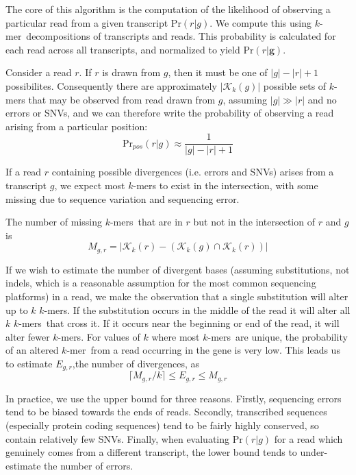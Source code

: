 \documentclass{bioinfo}
\newcommand{\kmer}{$k$-mer{}}
\newcommand{\kmers}{$k$-mers{}}
\begin{document}
The core of this algorithm is the computation of the likelihood of observing a particular read
from a given transcript $\textrm{Pr}(r|g)$. We compute this using \kmer\ decompositions of
transcripts and reads. This probability is calculated for each read across all transcripts,
and normalized to yield $\textrm{Pr}(r|\mathbf{g})$.

Consider a read $r$. If $r$ is drawn from $g$, then it must be one
of $|g| - |r| + 1$ possibilites.
Consequently there are approximately
$|\mathcal{K}_k(g)|$ possible sets of $k$-mers that may be observed
from read drawn from $g$, assuming $|g| \gg |r|$ and no errors or SNVs,
and we can therefore write the probability of observing a read arising from a particular position:
\begin{equation}\label{eqn:r}
\textrm{Pr}_{\textit{pos}}(r|g) \approx \frac{1}{|g| - |r| + 1}
\end{equation}

If a read $r$ containing possible divergences (i.e. errors and SNVs)
arises from a transcript $g$, we expect most $k$-mers to exist in
the intersection, with some missing due to sequence variation and
sequencing error.

The number of missing \kmers\ that are in $r$ but not in the intersection of $r$ and $g$ is
$$
M_{g,r} = \left| \mathcal{K}_k(r) - \left(\mathcal{K}_k(g) \cap \mathcal{K}_k(r) \right) \right|
$$

If we wish to estimate the number of divergent bases
(assuming substitutions, not indels, which is a reasonable assumption for
the most common sequencing platforms) in a read, we make the observation that
a single substitution will alter up to $k$ \kmers.
If the substitution occurs in the middle of the read it will alter
all $k$ \kmers\ that cross it. If it occurs near the beginning
or end of the read, it will alter fewer \kmers.
For values of $k$ where most \kmers\ are unique,
the probability of an altered \kmer\ from a read occurring in the gene is very low.
This leads us to estimate $E_{g,r}$,the number of divergences, as
$$
\lceil M_{g,r} / k \rceil \le E_{g,r} \le M_{g,r}
$$

In practice, we use the upper bound for three reasons.
Firstly, sequencing errors tend to be biased towards the ends of reads.
Secondly, transcribed sequences (especially protein coding sequences)
tend to be fairly highly conserved, so contain relatively few SNVs.
Finally, when evaluating $\textrm{Pr}(r|g)$ for a read which genuinely
comes from a different transcript, the lower bound tends to under-estimate
the number of errors.
\end{document}

